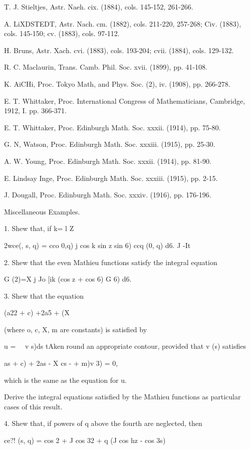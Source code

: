 {{T. J. Stieltjes, Astr. Naeh. cix. (1884), cols. 145-152, 261-266.

A. LiXDSTEDT, Astr. Nach. cm. (1882), cols. 211-220, 257-268; Civ.
(1883), cols. 145-150; cv. (1883), cols. 97-112.

H. Bruns, Astr. Xach. cvi. (1883), cols. 193-204; cvii. (1884), cols.
129-132.

R. C. Maclaurin, Trans. Camb. Phil. Soc. xvii. (1899), pp. 41-108.

K. AiCHi, Proc. Tokyo Math, and Phys. Soc. (2), iv. (1908), pp.
266-278.

E. T. Whittaker, Proc. International Congress of Mathematicians,
Cambridge, 1912, I. pp. 366-371.

E. T. Whittaker, Proc. Edinburgh Math. Soc. xxxii. (1914), pp. 75-80.

G. N, Watson, Proc. Edinburgh Math. Soc. xxxiii. (1915), pp. 25-30.

A. W. Young, Proc. Edinburgh Math. Soc. xxxii. (1914), pp. 81-90.

E. Lindsay Inge, Proc. Edinburgh Math. Soc. xxxiii. (1915), pp. 2-15.

J. Dougall, Proc. Edinburgh Math. Soc. xxxiv. (1916), pp. 176-196.

Miscellaneous Examples.

1. Shew that, if k= l Z \

2wce(, s, q) = cco 0,q) j cos k sin z sin 6) ccq (0, q) d6. J -It

2. Shew that the even Mathieu functions satisfy the integral equation

G (2)=X j Jo [ik (cos z + cos 6) G 6) d6.

3. Shew that the equation

(a22 + c) +2a5 + (X%

(where o, c, X, m are constants) is satisfied by

u = \ \ v s)ds tAken round an appropriate contour, provided that v (s)
satisfies

 as + c) + 2as - X cs - + m)v 3) = 0,

which is the same as the equation for u.

Derive the integral equations satisfied by the Mathieu functions as
particular cases of this result.

%
%

4. Shew that, if powers of q above the fourth are neglected, then

ce?! (s, q) = cos 2 + J cos 32 + q (J cos hz - cos 3s)

}}
